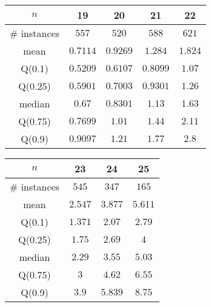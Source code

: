 \begin{tabular}{c|cccc} 
\hline 
$n$ & 19 & 20 & 21 & 22 \tabularnewline 
\hline 
\hline 
\# instances & $557$ & $520$ & $588$ & $621$ \tabularnewline 
mean & $0.7114$ & $0.9269$ & $1.284$ & $1.824$ \tabularnewline 
Q(0.1) & $0.5209$ & $0.6107$ & $0.8099$ & $1.07$ \tabularnewline 
Q(0.25) & $0.5901$ & $0.7003$ & $0.9301$ & $1.26$ \tabularnewline 
median & $0.67$ & $0.8301$ & $1.13$ & $1.63$ \tabularnewline 
Q(0.75) & $0.7699$ & $1.01$ & $1.44$ & $2.11$ \tabularnewline 
Q(0.9) & $0.9097$ & $1.21$ & $1.77$ & $2.8$ \tabularnewline 
\hline 
\end{tabular} 
\medskip{} 

\begin{tabular}{c|ccc} 
\hline 
$n$ & 23 & 24 & 25 \tabularnewline 
\hline 
\hline 
\# instances & $545$ & $347$ & $165$ \tabularnewline 
mean & $2.547$ & $3.877$ & $5.611$ \tabularnewline 
Q(0.1) & $1.371$ & $2.07$ & $2.79$ \tabularnewline 
Q(0.25) & $1.75$ & $2.69$ & $4$ \tabularnewline 
median & $2.29$ & $3.55$ & $5.03$ \tabularnewline 
Q(0.75) & $3$ & $4.62$ & $6.55$ \tabularnewline 
Q(0.9) & $3.9$ & $5.839$ & $8.75$ \tabularnewline 
\hline 
\end{tabular} 
\medskip{} 

